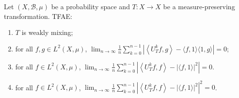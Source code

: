     \begin{proposition}\label{prop:characterization_of_weakly_mixing_mp}
        Let \((X, \mathcal{B}, \mu)\) be a probability space and \(T:X\to X\) be a measure-preserving transformation.
        TFAE:
        \begin{enumerate}
            \item \(T\) is weakly mixing;
            \item for all \(f, g \in L^2(X, \mu)\), \(\lim_{n\to \infty} \frac{1}{n} \sum_{k=0}^{n-1} \left| \left< U_T^k f, g \right> - \langle f, 1 \rangle \langle 1, g \rangle \right| = 0\);
            \item for all \(f \in L^2(X, \mu)\), \(\lim_{n\to \infty} \frac{1}{n} \sum_{k=0}^{n-1} \left| \left< U_T^k f, f \right> - |\langle f, 1 \rangle|^2 \right| = 0\).
            \item for all \(f \in L^2(X, \mu)\), \(\lim_{n\to \infty} \frac{1}{n} \sum_{k=0}^{n-1} \left| \left< U_T^k f, f \right> - |\langle f, 1 \rangle|^2 \right|^2 = 0\).
        \end{enumerate}
    \end{proposition}